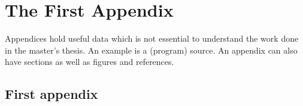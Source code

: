 \chapter{The First Appendix}
\label{app:A}
Appendices hold useful data which is not essential to understand the work
done in the master's thesis. An example is a (program) source.
An appendix can also have sections as well as figures and references\cite{h2g2}.

\section{First appendix}

